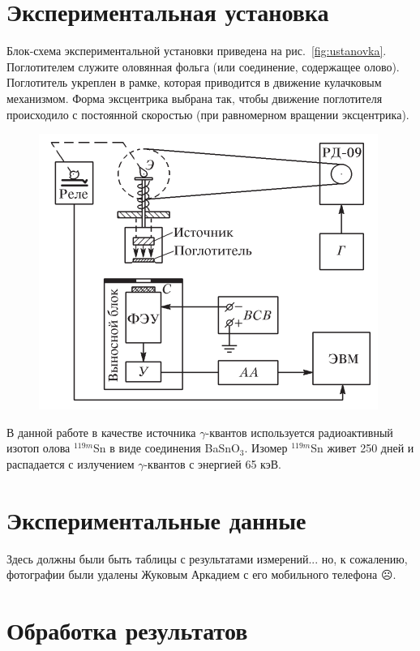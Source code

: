 \documentclass[a4paper,12pt]{article} %
\begin{document}
\section{Экспериментальная установка}
	Блок-схема экспериментальной установки приведена на рис.~\ref{fig:ustanovka}. Поглотителем служите оловянная фольга (или соединение, содержащее олово). Поглотитель укреплен в рамке, которая приводится в движение кулачковым механизмом. Форма эксцентрика выбрана так, чтобы движение поглотителя происходило с постоянной скоростью (при равномерном вращении эксцентрика).	
	\begin{figure}[h!]
		\begin{floatrow}
			{\includegraphics[scale=1]{ustanovka.pdf}}    
		\end{floatrow}
	\end{figure}
	
	В данной работе в качестве источника $\gamma$-квантов используется радиоактивный изотоп олова $^{119m}$Sn в виде соединения BaSnO$_3$. Изомер $^{119m}$Sn живет 250 дней и распадается с излучением $\gamma$-квантов с энергией 65 кэВ.
	
	\section{Экспериментальные данные}
		Здесь должны были быть таблицы с результатами измерений... но, к сожалению, фотографии были удалены Жуковым Аркадием с его мобильного телефона $\frownie$.
	
	\newpage
	\section{Обработка результатов}
\end{document}
